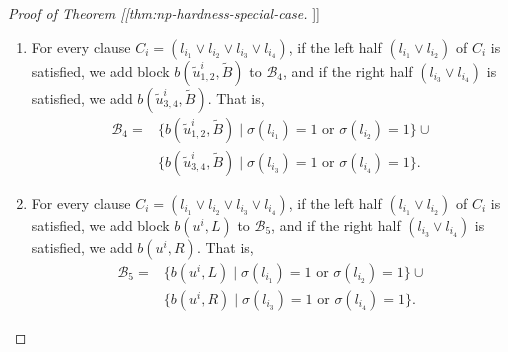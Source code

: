 \documentclass[fontsize=11pt,paper=a4]{book}
\begin{document}
\begin{proof}[Proof of Theorem [[thm:np-hardness-special-case]]]
\begin{enumerate}
\begin{enumerate}
\item if \(l_{i_1}\) evaluates to \(1\), we add block \(b(u_{1,2}^i,\tilde{L})\) to \(\mathscr{B}_3\),

\item if \(l_{i_2}\) evaluates to \(1\), we add \(b(u_{1,2}^i,\tilde{R})\),

\item if \(l_{i_3}\) evaluates to \(1\), we add \(b(u_{3,4}^i,\tilde{L})\), and

\item if \(l_{i_4}\) evaluates to \(1\), we add \(b(u_{3,4}^i,\tilde{R})\).
\end{enumerate}

That is,
\begin{align*}
\mathscr{B}_3=&\{b(u_{1,2}^i,\tilde{L})\mid\sigma(l_{i_1})=1\}\cup
\{b(u_{1,2}^i,\tilde{R})\mid\sigma(l_{i_2})=1\}\cup\\
&\{b(u_{3,4}^i,\tilde{L})\mid\sigma(l_{i_3})=1\}\cup
\{b(u_{3,4}^i,\tilde{R})\mid\sigma(l_{i_4})=1\}.
\end{align*}

\item For every clause \(C_i=(l_{i_1}\vee l_{i_2}\vee l_{i_3}\vee l_{i_4})\), if the left half \((l_{i_1}\vee l_{i_2})\) of \(C_i\) is satisfied, we add block \(b(\tilde{u}_{1,2}^i,\tilde{B})\) to \(\mathscr{B}_4\), and if the right half \((l_{i_3}\vee l_{i_4})\) is satisfied, we add \(b(\tilde{u}_{3,4}^i,\tilde{B})\).
That is,
\begin{align*}
\mathscr{B}_4=&\{b(\tilde{u}_{1,2}^i,\tilde{B})\mid\sigma(l_{i_1})=1\text{ or }\sigma(l_{i_2})=1\}\cup\\
&\{b(\tilde{u}_{3,4}^i,\tilde{B})\mid\sigma(l_{i_3})=1\text{ or }\sigma(l_{i_4})=1\}.
\end{align*}

\item For every clause \(C_i=(l_{i_1}\vee l_{i_2}\vee l_{i_3}\vee l_{i_4})\), if the left half \((l_{i_1}\vee l_{i_2})\) of \(C_i\) is satisfied, we add block \(b(u^i,L)\) to \(\mathscr{B}_5\), and if the right half \((l_{i_3}\vee l_{i_4})\) is satisfied, we add \(b(u^i,R)\).
That is,
\begin{align*}
\mathscr{B}_5=&\{b(u^i,L)\mid\sigma(l_{i_1})=1\text{ or }\sigma(l_{i_2})=1\}\cup\\
&\{b(u^i,R)\mid\sigma(l_{i_3})=1\text{ or }\sigma(l_{i_4})=1\}.
\end{align*}


\end{enumerate}
\end{proof}
\end{document}
